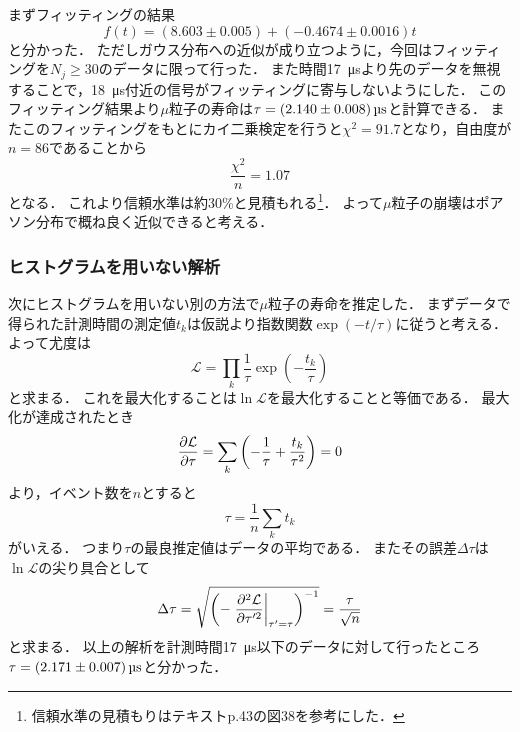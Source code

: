 \documentclass[a4paper,11pt]{jsarticle}
\begin{document}
まずフィッティングの結果
\begin{equation}
  f(t) = (8.603\pm 0.005) + (-0.4674\pm 0.0016)t
\end{equation}
と分かった．
ただしガウス分布への近似が成り立つように，今回はフィッティングを$N_j \ge 30$のデータに限って行った．
また時間\SI{17}{\us}より先のデータを無視することで，\SI{18}{\us}付近の信号がフィッティングに寄与しないようにした．
このフィッティング結果より$\mu$粒子の寿命は$\tau = \SI[separate-uncertainty]{2.140\pm 0.008}{\us}$と計算できる．
またこのフィッティングをもとにカイ二乗検定を行うと$\chi^2=91.7$となり，自由度が$n=86$であることから
\begin{equation}
  \frac{\chi^2}{n} = 1.07
\end{equation}
となる．
これより信頼水準は約30\%と見積もれる\footnote{信頼水準の見積もりはテキストp.43の図38を参考にした．}．
よって$\mu$粒子の崩壊はポアソン分布で概ね良く近似できると考える．


\subsubsection{ヒストグラムを用いない解析}

次にヒストグラムを用いない別の方法で$\mu$粒子の寿命を推定した．
まずデータで得られた計測時間の測定値$t_k$は仮説より指数関数$\exp(-t/\tau)$に従うと考える．
よって尤度は
\begin{equation}
  \mathcal{L} = \prod_k \frac{1}{\tau} \exp\left(-\frac{t_k}{\tau}\right)
\end{equation}
と求まる．
これを最大化することは$\ln{\mathcal{L}}$を最大化することと等価である．
最大化が達成されたとき
\begin{equation}
  \pdv{\mathcal{L}}{\tau} = \sum_k\qty(-\frac{1}{\tau} + \frac{t_k}{\tau^2}) = 0
\end{equation}
より，イベント数を$n$とすると
\begin{equation}
  \tau = \frac{1}{n} \sum_k t_k
\end{equation}
がいえる．
つまり$\tau$の最良推定値はデータの平均である．
またその誤差$\Delta \tau$は$\ln{\mathcal{L}}$の尖り具合として
\begin{equation}
  \Delta \tau = \sqrt{\qty(-\left.\frac{\partial^{2} \mathcal{L}
  }{\partial \tau'^2}\right|_{\tau'=\tau})^{-1}} = \frac{\tau}{\sqrt{n}}
\end{equation}
と求まる．
以上の解析を計測時間\SI{17}{\us}以下のデータに対して行ったところ$\tau = \SI[separate-uncertainty]{2.171\pm 0.007}{\us}$と分かった．
\end{document}
